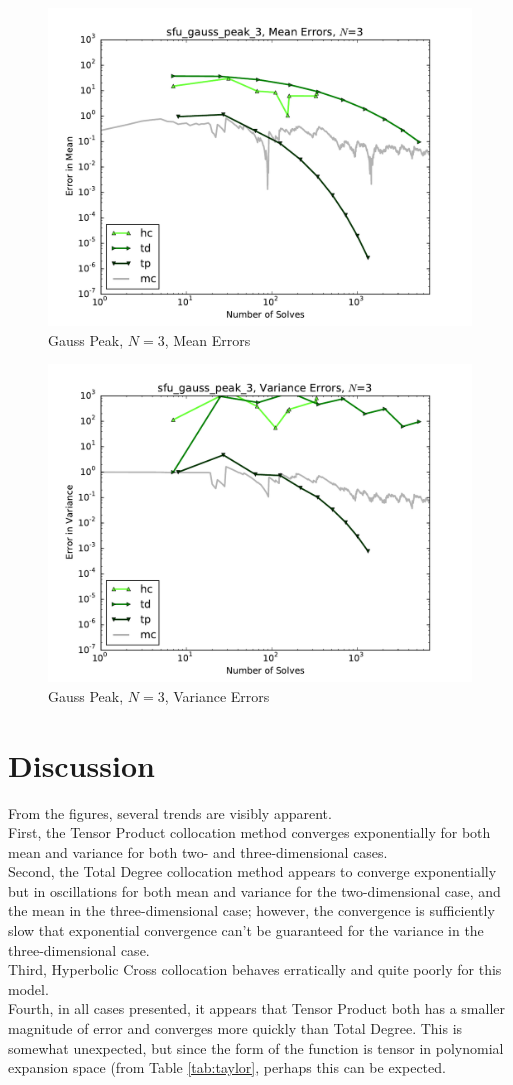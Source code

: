 \documentclass[11pt]{article}
\begin{document}
\begin{figure}[H]
  \centering
  \includegraphics[width=0.7\linewidth]{sfu_gauss_peak_3_mean_errs.pdf}
  \caption{Gauss Peak, $N=3$, Mean Errors}
  \label{fig:gp3m}
\end{figure}
\begin{figure}[H]
  \centering
  \includegraphics[width=0.7\linewidth]{sfu_gauss_peak_3_variance_errs.pdf}
  \caption{Gauss Peak, $N=3$, Variance Errors}
  \label{fig:gp3v}
\end{figure}

\section{Discussion}
From the figures, several trends are visibly apparent.\\

First, the Tensor Product collocation method converges exponentially for both mean and variance for both two-
and three-dimensional cases.\\

Second, the Total Degree collocation method appears to converge exponentially but in oscillations for both
mean and variance for the two-dimensional case, and the mean in the three-dimensional case; however, the
convergence is sufficiently slow that exponential convergence can't be guaranteed for the variance in the
three-dimensional case.\\

Third, Hyperbolic Cross collocation behaves erratically and quite poorly for this model.\\

Fourth, in all cases presented, it appears that Tensor Product both has a smaller magnitude of error and
converges more quickly than Total Degree.  This is somewhat unexpected, but since the form of the function
is tensor in polynomial expansion space (from Table \ref{tab:taylor}, perhaps this can be expected.
\end{document}
